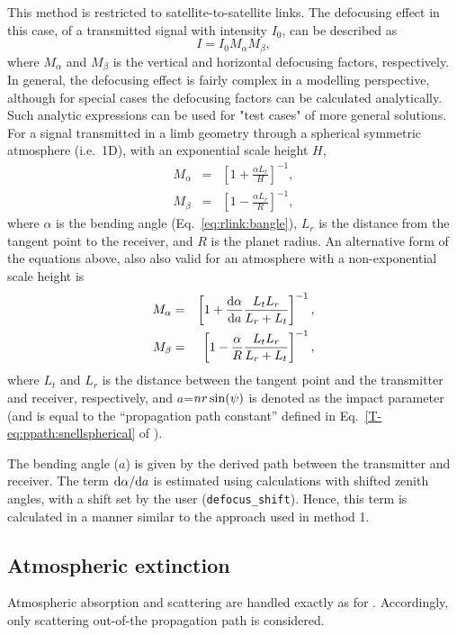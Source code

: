 This method is restricted to satellite-to-satellite links. The defocusing
effect in this case, of a transmitted signal with intensity \(I_{0}\), can be
described as \citep{haugstad:78:turbu,kursinski:00:thegp}
\begin{equation}
\label{eq:foc1}
I=I_{0}M_{\alpha}M_{\beta},
\end{equation}
where \(M_{\alpha}\) and \(M_{\beta}\) is the vertical and horizontal
defocusing factors, respectively. In general, the defocusing effect is fairly
complex in a modelling perspective, although for special cases the defocusing
factors can be calculated analytically. Such analytic expressions can be used
for "test cases" of more general solutions. For a signal transmitted in a limb
geometry through a spherical symmetric atmosphere (i.e.\ 1D), with an
exponential scale height \(H\), \citep{haugstad:78:turbu}
\begin{eqnarray}
 M_{\alpha} &=& \left[1+\frac{\alpha L_{r}}{H} \right]^{-1}, \nonumber \\
 M_{\beta}  &=& \left[1-\frac{\alpha L_{r}}{R} \right]^{-1}, \nonumber
\end{eqnarray}
where \(\alpha\) is the bending angle (Eq.~\ref{eq:rlink:bangle}), \(L_{r}\) is
the distance from the tangent point to the receiver, and \(R\) is the planet
radius. An alternative form of the equations above, also
also valid for an atmosphere with a non-exponential scale height is
\citep{kursinski:00:thegp}
\begin{eqnarray}
 \label{eq:kur1}
 M_{\alpha} &=& \left[1+\frac{\mathrm{d} \alpha}{\mathrm{d} a} 
               \frac{{L_{t}L_{r}}}{L_{r}+L_{t}} \right]^{-1}, \\
\label{eq:kur2}
 M_{\beta} &=& \left[1-\frac{\alpha}{R}
              \frac{{L_{t}L_{r}}}{L_{r}+L_{t}} \right]^{-1},
\end{eqnarray}
where $L_{t}$ and $L_{r}$ is the distance between the tangent point and the
transmitter and receiver, respectively, and \(a\)=\(nr\sin(\psi)\) is
denoted as the impact parameter (and is equal to the ``propagation path
constant'' defined in Eq.~\ref{T-eq:ppath:snellspherical} of \theory).

The bending angle ($a$) is given by the derived path between the transmitter and
receiver. The term $\mathrm{d} \alpha/\mathrm{d} a$ is estimated using calculations
with shifted zenith angles, with a shift set by the user
(\texttt{defocus\_shift}). Hence, this term is calculated in a manner similar
to the approach used in method 1.


\subsection{Atmospheric extinction}
\label{sec:rlink:atmext}
%
Atmospheric absorption and scattering are handled exactly as for
. Accordingly, only scattering
out-of-the propagation path is considered.



